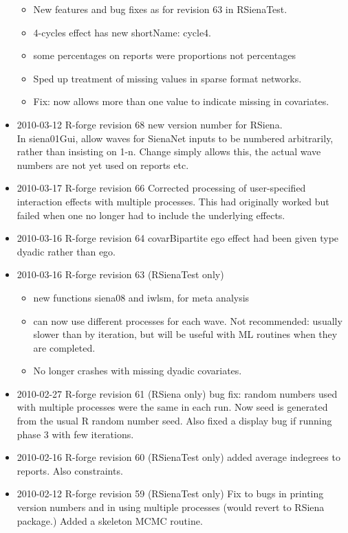 \documentclass[a4paper,fleqn,11pt]{article}
\newcommand{\+}{\, + \,}
\newcommand{\sfn}[1]{\textsf{#1}}
\newcommand{\R}{{\sf R }}
\begin{document}
\begin{small}
\begin{itemize}
\begin{itemize}
\item New features and bug fixes as for revision 63 in RSienaTest.
\item 4-cycles effect has new shortName: cycle4.
\item some percentages on reports were proportions not percentages
\item Sped up treatment of missing values in sparse format networks.
\item Fix: now allows more than one value to indicate missing in covariates.
\end{itemize}
\item 2010-03-12 R-forge revision 68 new version number for RSiena.\\
In \sfn{siena01Gui}, allow waves for SienaNet inputs to be numbered
arbitrarily, rather than insisting on 1-n. Change simply allows this, the actual
wave numbers are not yet used on reports etc.
\item 2010-03-17 R-forge revision 66
Corrected processing of user-specified interaction effects with multiple
processes. This had originally worked but failed when one no longer had to
include the underlying effects.
\item 2010-03-16 R-forge revision 64
covarBipartite ego effect had been given type dyadic rather than ego.
\item 2010-03-16 R-forge revision 63 (RSienaTest only)
\begin{itemize}
\item new functions \sfn{siena08} and \sfn{iwlsm}, for meta analysis
\item can now use different processes for each wave. Not recommended: usually
  slower than by iteration, but will be useful with ML routines when they are
  completed.
\item No longer crashes with missing dyadic covariates.
\end{itemize}
\item 2010-02-27 R-forge revision 61 (RSiena only) bug fix: random numbers used
  with multiple processes were the same in each run. Now seed is generated
  from the usual \R random number seed. Also fixed a display bug if running
  phase 3 with few iterations.
\item 2010-02-16 R-forge revision 60 (RSienaTest only) added average indegrees
  to reports. Also constraints.
\item 2010-02-12 R-forge revision 59 (RSienaTest only) Fix to bugs in printing
  version numbers and in using multiple processes (would revert to RSiena
  package.) Added a skeleton MCMC routine.

\end{itemize}
\end{small}
\end{document}
